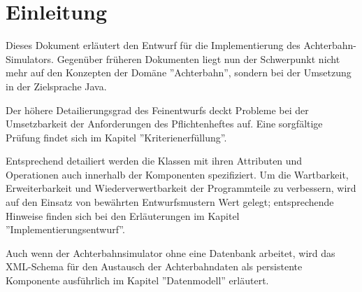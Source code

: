 
\chapter{Einleitung}

Dieses Dokument erläutert den Entwurf für die Implementierung des Achterbahn-Simulators.
Gegenüber früheren Dokumenten liegt nun der Schwerpunkt nicht mehr auf den Konzepten 
der Domäne ''Achterbahn'', sondern bei der Umsetzung in der Zielsprache Java. 

Der höhere Detailierungsgrad des Feinentwurfs deckt Probleme bei der Umsetzbarkeit
der Anforderungen des Pflichtenheftes auf. Eine sorgfältige Prüfung findet sich im 
Kapitel ''Kriterienerfüllung''.

Entsprechend detailiert werden die Klassen mit ihren Attributen und Operationen auch innerhalb der
Komponenten spezifiziert. Um die Wartbarkeit, Erweiterbarkeit und Wiederverwertbarkeit
der Programmteile zu verbessern, wird auf den Einsatz von bewährten Entwurfsmustern
Wert gelegt; entsprechende Hinweise finden sich bei den Erläuterungen im Kapitel 
''Implementierungsentwurf''.

Auch wenn der Achterbahnsimulator ohne eine Datenbank arbeitet, wird das XML-Schema
für den Austausch der Achterbahndaten als persistente Komponente ausführlich 
im Kapitel ''Datenmodell'' erläutert.

